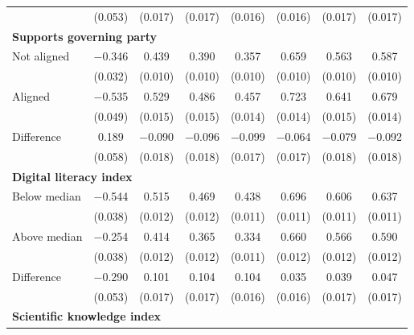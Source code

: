 \begin{tabular}[t]{lccccccc}
 & (\num{0.053}) & (\num{0.017}) & (\num{0.017}) & (\num{0.016}) & (\num{0.016}) & (\num{0.017}) & (\num{0.017})\\\multicolumn{4}{l}{\textbf{Supports governing party}} \rule{0pt}{1.2\normalbaselineskip}\\
\hspace{1em} Not aligned & \num{-0.346} & \num{0.439} & \num{0.390} & \num{0.357} & \num{0.659} & \num{0.563} & \num{0.587}\\
 & (\num{0.032}) & (\num{0.010}) & (\num{0.010}) & (\num{0.010}) & (\num{0.010}) & (\num{0.010}) & (\num{0.010})\\
\hspace{1em} Aligned & \num{-0.535} & \num{0.529} & \num{0.486} & \num{0.457} & \num{0.723} & \num{0.641} & \num{0.679}\\
 & (\num{0.049}) & (\num{0.015}) & (\num{0.015}) & (\num{0.014}) & (\num{0.014}) & (\num{0.015}) & (\num{0.014})\\\cmidrule(lr){2-8}
\hspace{1em} Difference & \num{0.189} & \num{-0.090} & \num{-0.096} & \num{-0.099} & \num{-0.064} & \num{-0.079} & \num{-0.092}\\
 & (\num{0.058}) & (\num{0.018}) & (\num{0.018}) & (\num{0.017}) & (\num{0.017}) & (\num{0.018}) & (\num{0.018})\\\multicolumn{4}{l}{\textbf{Digital literacy index}} \rule{0pt}{1.2\normalbaselineskip}\\
\hspace{1em} Below median & \num{-0.544} & \num{0.515} & \num{0.469} & \num{0.438} & \num{0.696} & \num{0.606} & \num{0.637}\\
 & (\num{0.038}) & (\num{0.012}) & (\num{0.012}) & (\num{0.011}) & (\num{0.011}) & (\num{0.011}) & (\num{0.011})\\
\hspace{1em} Above median & \num{-0.254} & \num{0.414} & \num{0.365} & \num{0.334} & \num{0.660} & \num{0.566} & \num{0.590}\\
 & (\num{0.038}) & (\num{0.012}) & (\num{0.012}) & (\num{0.011}) & (\num{0.012}) & (\num{0.012}) & (\num{0.012})\\\cmidrule(lr){2-8}
\hspace{1em}  Difference & \num{-0.290} & \num{0.101} & \num{0.104} & \num{0.104} & \num{0.035} & \num{0.039} & \num{0.047}\\
 & (\num{0.053}) & (\num{0.017}) & (\num{0.017}) & (\num{0.016}) & (\num{0.016}) & (\num{0.017}) & (\num{0.017})\\\multicolumn{4}{l}{\textbf{Scientific knowledge index}} \rule{0pt}{1.2\normalbaselineskip}\\

\end{tabular}
